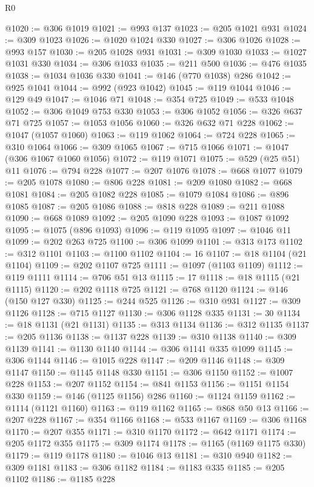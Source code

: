 \begin{lexlean}{R0}
\begin{coremodule}
@1020 := @306 @1019
@1021 := @993 @137
@1023 := @205 @1021 @931
@1024 := @309 @1023
@1026 := @1020 @1024 @330
@1027 := @306 @1026
@1028 := @993 @157
@1030 := @205 @1028 @931
@1031 := @309 @1030
@1033 := @1027 @1031 @330
@1034 := @306 @1033
@1035 := @211 @500
@1036 := @476 @1035
@1038 := @1034 @1036 @330
@1041 := @146 (@770 @1038) @286
@1042 := @925 @1041
@1044 := @992 (@923 @1042)
@1045 := @119 @1044
@1046 := @129 @49
@1047 := @1046 @71
@1048 := @354 @725
@1049 := @533 @1048
@1052 := @306 @1049 @753 @330
@1053 := @306 @1052
@1056 := @326 @637 @71 @725
@1057 := @1053 @1056
@1060 := @326 @632 @71 @228
@1062 := @1047 (@1057 @1060)
@1063 := @119 @1062
@1064 := @724 @228
@1065 := @310 @1064
@1066 := @309 @1065
@1067 := @715 @1066
@1071 := @1047 (@306 @1067 @1060 @1056)
@1072 := @119 @1071
@1075 := @529 (@25 @51) @11
@1076 := @794 @228
@1077 := @207 @1076
@1078 := @668 @1077
@1079 := @205 @1078
@1080 := @806 @228
@1081 := @209 @1080
@1082 := @668 @1081
@1084 := @205 @1082 @228
@1085 := @1079 @1084
@1086 := @896 @1085
@1087 := @205 @1086
@1088 := @818 @228
@1089 := @211 @1088
@1090 := @668 @1089
@1092 := @205 @1090 @228
@1093 := @1087 @1092
@1095 := @1075 (@896 @1093)
@1096 := @119 @1095
@1097 := @1046 @11
@1099 := @202 @263 @725
@1100 := @306 @1099
@1101 := @313 @173
@1102 := @312 @1101
@1103 := @1100 @1102
@1104 := 16
@1107 := @18 @1104 (@21 @1104)
@1109 := @202 @1107 @725
@1111 := @1097 (@1103 @1109)
@1112 := @119 @1111
@1114 := @706 @51 @13
@1115 := 17
@1118 := @18 @1115 (@21 @1115)
@1120 := @202 @1118 @725
@1121 := @768 @1120
@1124 := @146 (@150 @127 @330)
@1125 := @244 @525
@1126 := @310 @931
@1127 := @309 @1126
@1128 := @715 @1127
@1130 := @306 @1128 @335
@1131 := 30
@1134 := @18 @1131 (@21 @1131)
@1135 := @313 @1134
@1136 := @312 @1135
@1137 := @205 @1136
@1138 := @1137 @228
@1139 := @310 @1138
@1140 := @309 @1139
@1141 := @1130 @1140
@1144 := @306 @1141 @335 @1099
@1145 := @306 @1144
@1146 := @1015 @228
@1147 := @209 @1146
@1148 := @309 @1147
@1150 := @1145 @1148 @330
@1151 := @306 @1150
@1152 := @1007 @228
@1153 := @207 @1152
@1154 := @841 @1153
@1156 := @1151 @1154 @330
@1159 := @146 (@1125 @1156) @286
@1160 := @1124 @1159
@1162 := @1114 (@1121 @1160)
@1163 := @119 @1162
@1165 := @868 @50 @13
@1166 := @207 @228
@1167 := @354 @1166
@1168 := @533 @1167
@1169 := @306 @1168
@1170 := @207 @355
@1171 := @310 @1170
@1172 := @642 @1171
@1174 := @205 @1172 @355
@1175 := @309 @1174
@1178 := @1165 (@1169 @1175 @330)
@1179 := @119 @1178
@1180 := @1046 @13
@1181 := @310 @940
@1182 := @309 @1181
@1183 := @306 @1182
@1184 := @1183 @335
@1185 := @205 @1102
@1186 := @1185 @228

\end{coremodule}
\end{lexlean}

